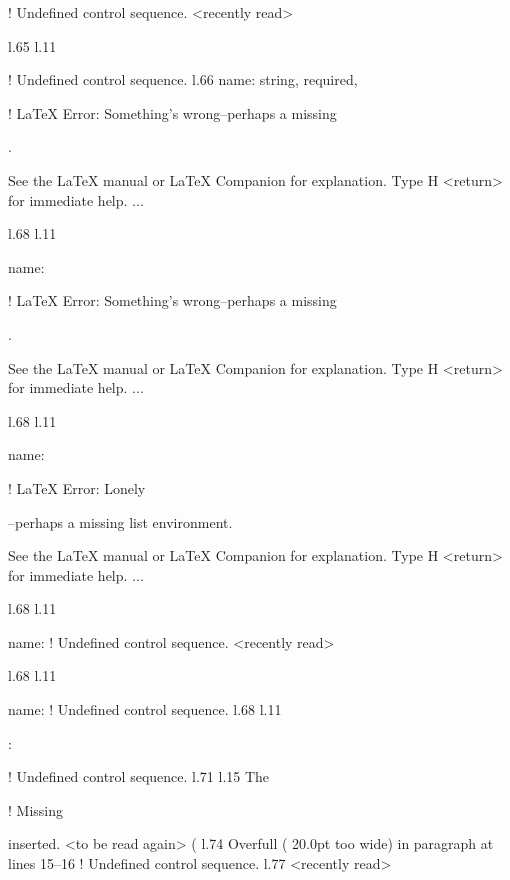 {{{{{{{{{{{{{{{{! Undefined control sequence.
<recently read> \xmlAttr 
                         
l.65 l.11       \item \xmlAttr
                              
! Undefined control sequence.
l.66                          {name}: \xmlDesc
                                              {string, required},

! LaTeX Error: Something's wrong--perhaps a missing \item.

See the LaTeX manual or LaTeX Companion for explanation.
Type  H <return>  for immediate help.
 ...                                              
                                                  
l.68 l.11       \item \xmlAttr
                              {name}: \xmlDesc

! LaTeX Error: Something's wrong--perhaps a missing \item.

See the LaTeX manual or LaTeX Companion for explanation.
Type  H <return>  for immediate help.
 ...                                              
                                                  
l.68 l.11       \item \xmlAttr
                              {name}: \xmlDesc

! LaTeX Error: Lonely \item--perhaps a missing list environment.

See the LaTeX manual or LaTeX Companion for explanation.
Type  H <return>  for immediate help.
 ...                                              
                                                  
l.68 l.11       \item \xmlAttr
                              {name}: \xmlDesc
! Undefined control sequence.
<recently read> \xmlAttr 
                         
l.68 l.11       \item \xmlAttr
                              {name}: \xmlDesc
! Undefined control sequence.
l.68 l.11       \item {}: \xmlDesc
                                              
! Undefined control sequence.
l.71 l.15   The \xmlNode
                        
! Missing { inserted.
<to be read again> 
                   (
l.74 Overfull \hbox (
                     20.0pt too wide) in paragraph at lines 15--16
! Undefined control sequence.
l.77 <recently read> \xmlNode
                             

}}}}}}}}}}}}}}}}}
